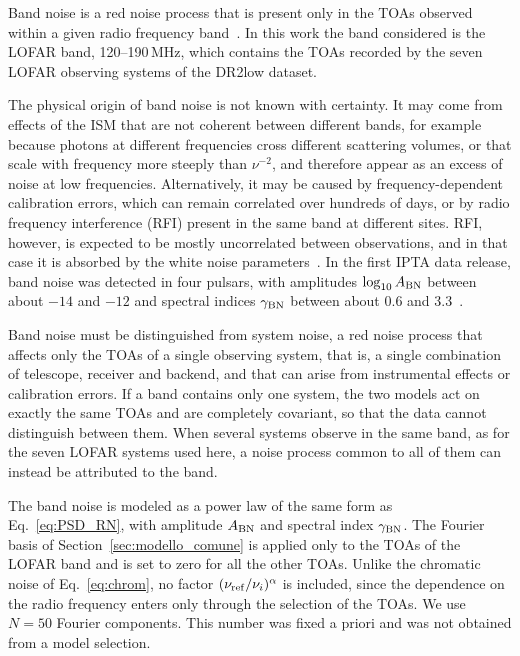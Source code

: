 Band noise is a red noise process that is present only in the TOAs observed
within a given radio frequency band~\cite{Lentati2016}. In this work the band considered is the
LOFAR band, 120--190\,MHz, which contains the TOAs recorded by the seven LOFAR
observing systems of the DR2low dataset.

The physical origin of band noise is not known with certainty. It may come from
effects of the ISM that are not coherent between different bands, for example
because photons at different frequencies cross different scattering volumes, or
that scale with frequency more steeply than $\nu^{-2}$, and therefore appear as
an excess of noise at low frequencies. Alternatively, it may be caused by
frequency-dependent calibration errors, which can remain correlated over
hundreds of days, or by radio frequency interference (RFI) present in the same
band at different sites. RFI, however, is expected to be mostly uncorrelated
between observations, and in that case it is absorbed by the white noise
parameters~\cite{Lentati2016}. In the first IPTA data release, band noise was detected in four
pulsars, with amplitudes $\log_{10}A_{\rm BN}$ between about $-14$ and $-12$
and spectral indices $\gamma_{\rm BN}$ between about $0.6$ and
$3.3$~\cite{Lentati2016}.

Band noise must be distinguished from system noise, a red noise process that
affects only the TOAs of a single observing system, that is, a single
combination of telescope, receiver and backend, and that can arise from
instrumental effects or calibration errors. If a band contains only one
system, the two models act on exactly the same TOAs and are completely
covariant, so that the data cannot distinguish between them. When several
systems observe in the same band, as for the seven LOFAR systems used here, a
noise process common to all of them can instead be attributed to the band.

The band noise is modeled as a power law of the same form as
Eq.~\eqref{eq:PSD_RN}, with amplitude $A_{\rm BN}$ and spectral index
$\gamma_{\rm BN}$. The Fourier basis of Section~\ref{sec:modello_comune} is
applied only to the TOAs of the LOFAR band and is set to zero for all the other
TOAs. Unlike the chromatic noise of Eq.~\eqref{eq:chrom}, no factor
$(\nu_{\rm ref}/\nu_i)^{\alpha}$ is included, since the dependence on the radio
frequency enters only through the selection of the TOAs. We use $N = 50$
Fourier components. This number was fixed a priori and was not obtained from a
model selection.

